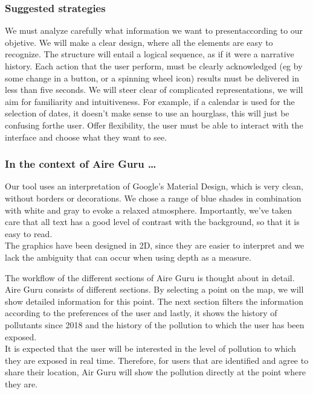\subsubsection*{Suggested strategies} 

We must analyze carefully what information we want to presentaccording to our objetive. We will make a clear design, where all the elements are easy to recognize.
The structure will entail a logical sequence, as if it were a narrative history.
Each action that the user perform, must be clearly acknowledged (eg by some change in a button, or a spinning wheel icon) results must be delivered in less than five seconds.
We will steer clear of complicated representations, we will aim for familiarity and intuitiveness.
For example, if a calendar is used for the selection of dates, it doesn't make sense to use an hourglass, this will just be confusing forthe user.
Offer flexibility, the user must be able to interact with the interface and choose what they want to see.

\subsubsection*{In the context of Aire Guru \ldots}

Our tool uses an interpretation of Google's Material Design, which is very clean, without borders or decorations.
We chose a range of blue shades in combination with white and gray to evoke a relaxed atmosphere.
Importantly, we've taken care that all text has a good level of contrast with the background, so that it is easy to read.\\

The graphics have been designed in 2D, since they are easier to interpret and we lack the ambiguity that can occur when using depth as a measure.

The workflow of the different sections of Aire Guru is thought about in detail.
Aire Guru consists of different sections. By selecting a point on the map, we
will show detailed information for this point. The next section filters the information according to the preferences of the user
and lastly, it shows the history of pollutants since 2018 and the history of the pollution to which the user has been
exposed.\\

It is expected that the user will be interested in the level of pollution to which they are exposed in real time. Therefore, for users
that are identified and agree to share their location, Air Guru will show the pollution directly at the point where they are.\\

